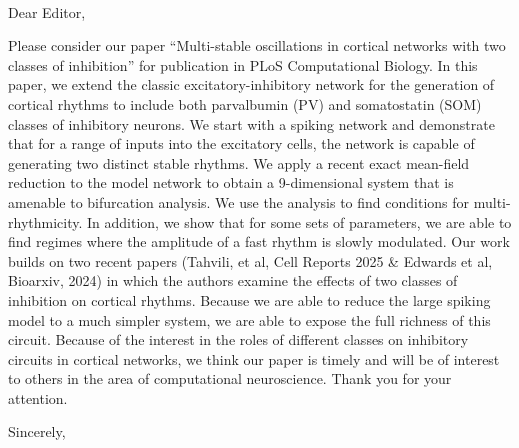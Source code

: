 \documentclass[11pt]{letter}
\begin{document}
\begin{letter}{~} 


\signature{\vspace*{-0.5cm}Arnab Dey Sarkar\\
Bard Ermentrout}


\opening{Dear Editor,}
Please consider our paper ``Multi-stable oscillations in cortical networks with two classes of inhibition'' for publication in PLoS Computational Biology. In this paper, we extend the classic excitatory-inhibitory network for the generation of cortical rhythms to include both parvalbumin (PV) and somatostatin (SOM) classes of inhibitory neurons. We start with a spiking network and demonstrate that for a range of inputs into the excitatory cells, the network is capable of generating two distinct stable rhythms. We apply a recent exact mean-field reduction to the model network to obtain a 9-dimensional system that is amenable to bifurcation analysis. We use the analysis to find conditions for multi-rhythmicity. In addition, we show that for some sets of parameters, we are able to find regimes where the amplitude of a fast rhythm is slowly modulated.  Our work builds on two recent papers (Tahvili, et al, Cell Reports 2025 \& Edwards et al, Bioarxiv, 2024) in which the authors examine the effects of two classes of inhibition on cortical rhythms. Because we are able to reduce the large spiking model to a much simpler system, we are able to expose the full richness of this circuit. Because of the interest in the roles of different classes on inhibitory circuits in cortical networks, we think our paper is timely and will be of interest to others in the area of computational neuroscience. Thank you for your attention.



\closing{Sincerely,}

\end{letter}
\end{document}
